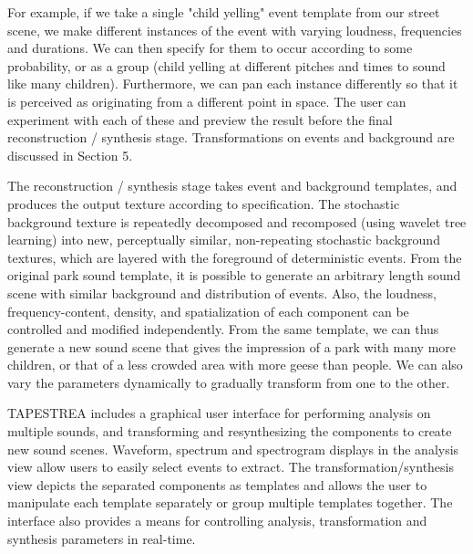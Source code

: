 \documentclass{acmsiggraph}               %
\begin{document}
For example, if we take a single "child yelling" event template from our 
street scene, we make different instances of the event with varying 
loudness, frequencies and durations.  We can then specify for them to occur 
according to some probability, or as a group (child yelling at different 
pitches and times to sound like many children).  Furthermore, we can pan 
each instance differently so that it is perceived as originating from a 
different point in space. The user can experiment with each of these and 
preview the result before the final reconstruction / synthesis stage.  
Transformations on events and background are discussed in Section 5.


The reconstruction / synthesis stage takes event and background templates,
and produces the output texture according to specification.
The stochastic background texture is repeatedly decomposed and 
recomposed (using wavelet tree learning) into new,
perceptually similar, non-repeating stochastic background textures, 
which are layered with the foreground of deterministic events.  From the 
original park sound template, it is possible to generate an arbitrary length 
sound scene with similar background and distribution of events.  Also, the 
loudness, frequency-content, density, and spatialization of each 
component can be controlled and modified independently.  From the same 
template, we can thus generate a new sound scene that gives the impression 
of a park with many more children, or that of a less crowded area with more geese 
than people. We can also vary the parameters dynamically to gradually transform 
from one to the other.

TAPESTREA includes a graphical user interface for performing analysis on 
multiple sounds, and transforming and resynthesizing the components to 
create new sound scenes. Waveform, spectrum and spectrogram displays in 
the analysis view allow users to easily select events to extract. The 
transformation/synthesis view depicts the separated components as 
templates and allows the user to manipulate each template separately or 
group multiple templates together. The interface also provides a means 
for controlling analysis, transformation and synthesis parameters in 
real-time. 



\end{document}
